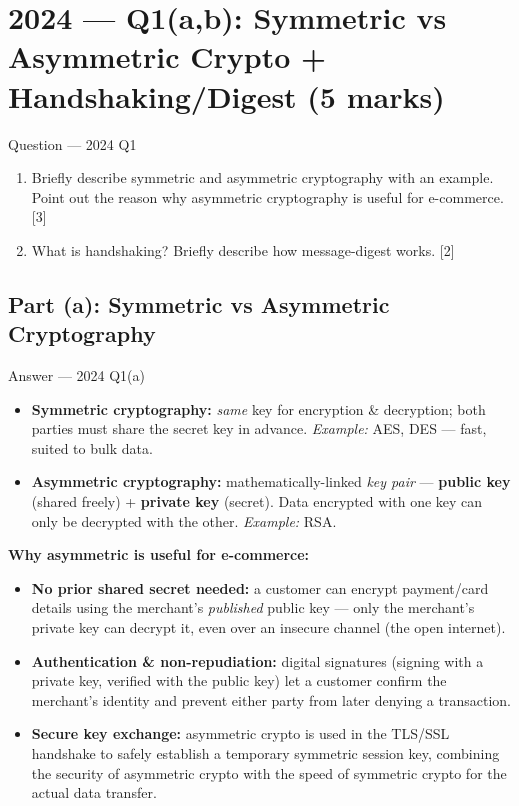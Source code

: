 \documentclass[12pt,a4paper]{article}
\begin{document}
\newpage
\section{2024 --- Q1(a,b): Symmetric vs Asymmetric Crypto + Handshaking/Digest (5 marks)}

\begin{qbox}{Question --- 2024 Q1}
\begin{enumerate}[label=(\alph*)]
  \item Briefly describe symmetric and asymmetric cryptography with an example. Point out the reason why asymmetric cryptography is useful for e-commerce. \hfill [3]
  \item What is handshaking? Briefly describe how message-digest works. \hfill [2]
\end{enumerate}
\end{qbox}

\subsection{Part (a): Symmetric vs Asymmetric Cryptography}
\begin{solbox}{Answer --- 2024 Q1(a)}
\begin{itemize}[noitemsep]
  \item \textbf{Symmetric cryptography:} \emph{same} key for encryption \& decryption; both parties must share the secret key in advance. \emph{Example:} AES, DES --- fast, suited to bulk data.
  \item \textbf{Asymmetric cryptography:} mathematically-linked \emph{key pair} --- \textbf{public key} (shared freely) + \textbf{private key} (secret). Data encrypted with one key can only be decrypted with the other. \emph{Example:} RSA.
\end{itemize}

\textbf{Why asymmetric is useful for e-commerce:}
\begin{itemize}[noitemsep]
  \item \textbf{No prior shared secret needed:} a customer can encrypt payment/card details using the merchant's \emph{published} public key --- only the merchant's private key can decrypt it, even over an insecure channel (the open internet).
  \item \textbf{Authentication \& non-repudiation:} digital signatures (signing with a private key, verified with the public key) let a customer confirm the merchant's identity and prevent either party from later denying a transaction.
  \item \textbf{Secure key exchange:} asymmetric crypto is used in the TLS/SSL handshake to safely establish a temporary symmetric session key, combining the security of asymmetric crypto with the speed of symmetric crypto for the actual data transfer.
\end{itemize}
\end{solbox}
\end{document}
